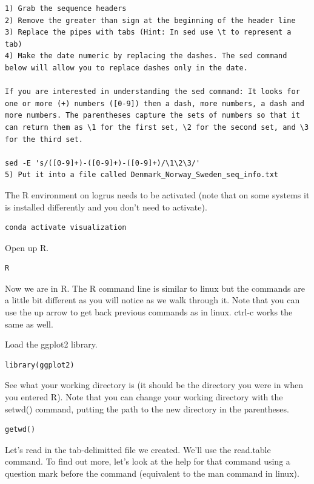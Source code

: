 \documentclass[
]{book}
\begin{document}
\begin{verbatim}
1) Grab the sequence headers
2) Remove the greater than sign at the beginning of the header line
3) Replace the pipes with tabs (Hint: In sed use \t to represent a tab)
4) Make the date numeric by replacing the dashes. The sed command below will allow you to replace dashes only in the date.

If you are interested in understanding the sed command: It looks for one or more (+) numbers ([0-9]) then a dash, more numbers, a dash and more numbers. The parentheses capture the sets of numbers so that it can return them as \1 for the first set, \2 for the second set, and \3 for the third set.

sed -E 's/([0-9]+)-([0-9]+)-([0-9]+)/\1\2\3/'
5) Put it into a file called Denmark_Norway_Sweden_seq_info.txt
\end{verbatim}

The R environment on logrus needs to be activated (note that on some systems it is installed differently and you don't need to activate).

\begin{verbatim}
conda activate visualization
\end{verbatim}

Open up R.

\begin{verbatim}
R
\end{verbatim}

Now we are in R. The R command line is similar to linux but the commands are a little bit different as you will notice as we walk through it. Note that you can use the up arrow to get back previous commands as in linux. ctrl-c works the same as well.

Load the ggplot2 library.

\begin{verbatim}
library(ggplot2)
\end{verbatim}

See what your working directory is (it should be the directory you were in when you entered R). Note that you can change your working directory with the setwd() command, putting the path to the new directory in the parentheses.

\begin{verbatim}
getwd()
\end{verbatim}

Let's read in the tab-delimitted file we created. We'll use the read.table command. To find out more, let's look at the help for that command using a question mark before the command (equivalent to the man command in linux).
\end{document}
